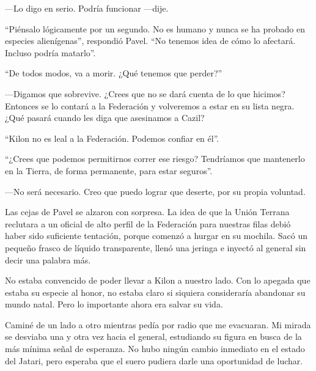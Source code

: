—Lo digo en serio. Podría funcionar —dije.

``Piénsalo lógicamente por un segundo. No es humano y nunca se ha probado en especies alienígenas'', respondió Pavel. ``No tenemos idea de cómo lo afectará. Incluso podría matarlo''.

``De todos modos, va a morir. ¿Qué tenemos que perder?''

—Digamos que sobrevive. ¿Crees que no se dará cuenta de lo que hicimos? Entonces se lo contará a la Federación y volveremos a estar en su lista negra. ¿Qué pasará cuando les diga que asesinamos a Cazil?

``Kilon no es leal a la Federación. Podemos confiar en él''.

``¿Crees que podemos permitirnos correr ese riesgo? Tendríamos que mantenerlo en la Tierra, de forma permanente, para estar seguros''.

—No será necesario. Creo que puedo lograr que deserte, por su propia voluntad.

Las cejas de Pavel se alzaron con sorpresa. La idea de que la Unión Terrana reclutara a un oficial de alto perfil de la Federación para nuestras filas debió haber sido suficiente tentación, porque comenzó a hurgar en su mochila. Sacó un pequeño frasco de líquido transparente, llenó una jeringa e inyectó al general sin decir una palabra más.

No estaba convencido de poder llevar a Kilon a nuestro lado. Con lo apegada que estaba su especie al honor, no estaba claro si siquiera consideraría abandonar su mundo natal. Pero lo importante ahora era salvar su vida.

Caminé de un lado a otro mientras pedía por radio que me evacuaran. Mi mirada se desviaba una y otra vez hacia el general, estudiando su figura en busca de la más mínima señal de esperanza. No hubo ningún cambio inmediato en el estado del Jatari, pero esperaba que el suero pudiera darle una oportunidad de luchar.